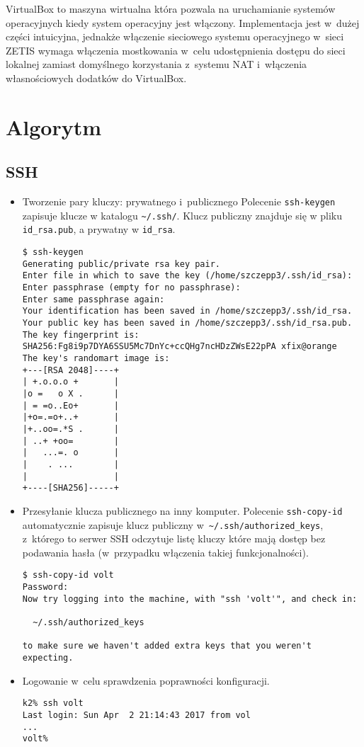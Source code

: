 \documentclass[a4paper,11pt]{article}
\begin{document}
VirtualBox to maszyna wirtualna która pozwala na uruchamianie systemów
operacyjnych kiedy system operacyjny jest włączony. Implementacja jest
w~dużej części intuicyjna, jednakże włączenie sieciowego systemu operacyjnego
w~sieci ZETIS wymaga włączenia mostkowania w~celu udostępnienia dostępu
do sieci lokalnej zamiast domyślnego korzystania z~systemu NAT i~włączenia
własnościowych dodatków do VirtualBox.


\section{Algorytm}

\subsection{SSH}

\begin{itemize}

\item Tworzenie pary kluczy: prywatnego i~publicznego
Polecenie \verb|ssh-keygen| zapisuje klucze w katalogu \verb|~/.ssh/|. Klucz publiczny znajduje się w pliku \verb|id_rsa.pub|, a prywatny w \verb|id_rsa|.


\begin{verbatim}
$ ssh-keygen 
Generating public/private rsa key pair.
Enter file in which to save the key (/home/szczepp3/.ssh/id_rsa): 
Enter passphrase (empty for no passphrase): 
Enter same passphrase again: 
Your identification has been saved in /home/szczepp3/.ssh/id_rsa.
Your public key has been saved in /home/szczepp3/.ssh/id_rsa.pub.
The key fingerprint is:
SHA256:Fg8i9p7DYA6SSU5Mc7DnYc+ccQHg7ncHDzZWsE22pPA xfix@orange
The key's randomart image is:
+---[RSA 2048]----+
| +.o.o.o +       |
|o =   o X .      |
| = =o..Eo+       |
|+o=.=o+..+       |
|+..oo=.*S .      |
| ..+ +oo=        |
|   ...=. o       |
|    . ...        |
|                 |
+----[SHA256]-----+
\end{verbatim}

\item Przesyłanie klucza publicznego na inny komputer. Polecenie
\verb|ssh-copy-id| automatycznie zapisuje klucz publiczny
w~\verb|~/.ssh/authorized_keys|, z~którego to serwer SSH odczytuje
listę kluczy które mają dostęp bez podawania hasła (w~przypadku
włączenia takiej funkcjonalności).

\begin{verbatim}
$ ssh-copy-id volt
Password: 
Now try logging into the machine, with "ssh 'volt'", and check in:

  ~/.ssh/authorized_keys

to make sure we haven't added extra keys that you weren't expecting.
\end{verbatim}

\item Logowanie w~celu sprawdzenia poprawności konfiguracji.

\begin{verbatim}
k2% ssh volt
Last login: Sun Apr  2 21:14:43 2017 from vol
...
volt%
\end{verbatim}

\end{itemize}
\end{document}
